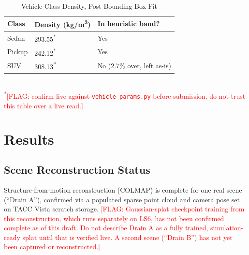 \documentclass[conference]{IEEEtran}
\newcommand{\FLAG}[1]{\textcolor{red}{[FLAG: #1]}}
\begin{document}
\begin{table}[t]
\caption{Vehicle Class Density, Post Bounding-Box Fit}
\label{tab:vehicle}
\centering
\begin{tabular}{@{}p{0.7in}p{0.95in}p{1.1in}@{}}
\toprule
\textbf{Class} & \textbf{Density (kg/m\textsuperscript{3})} & \textbf{In heuristic band?} \\
\midrule
Sedan & 293.55\textsuperscript{*} & Yes \\
Pickup & 242.12\textsuperscript{*} & Yes \\
SUV & 308.13\textsuperscript{*} & No (2.7\% over, left as-is) \\
\bottomrule
\end{tabular}
\\[2pt]
{\footnotesize \textsuperscript{*}\FLAG{confirm live against \texttt{vehicle\_params.py} before submission, do not trust this table over a live read.}}
\end{table}

\section{Results}
\label{sec:results}

\subsection{Scene Reconstruction Status}
Structure-from-motion reconstruction (COLMAP) is complete for one real scene (``Drain A''), confirmed via a populated sparse point cloud and camera pose set on TACC Vista scratch storage. \FLAG{Gaussian-splat checkpoint training from this reconstruction, which runs separately on LS6, has not been confirmed complete as of this draft. Do not describe Drain A as a fully trained, simulation-ready splat until that is verified live. A second scene (``Drain B'') has not yet been captured or reconstructed.}
\end{document}
